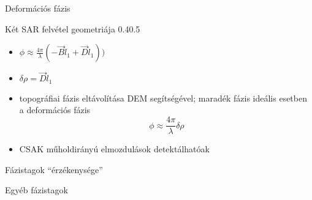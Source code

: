\def\ft{Deformációs fázis}

\begin{frame}{\ft}
    \begin{figp}{}{Két SAR felvétel geometriája \cite{BurgmannInSAR}}{0.4}{0.5}
        \begin{itemize}
            \item $\phi \approx \frac{4\pi}{\lambda} (- \vec{B}\hat{l}_1 + \vec{D}\hat{l}_1))$
            \item $\delta\rho = \vec{D}\hat{l}_1$
            \item topográfiai fázis eltávolítása DEM segítségével; maradék fázis ideális esetben a deformációs fázis $$\phi \approx \frac{4\pi}{\lambda}\delta\rho$$
            \item CSAK műholdirányú elmozdulások detektálhatóak
        \end{itemize}
    \end{figp}
\end{frame}


\begin{frame}{Fázistagok ``érzékenysége''}
    \begin{center}
    \begin{minipage}[b]{0.45\textwidth}
        \centering
        
    \end{minipage}
    \hspace{10pt}
    \begin{minipage}[b]{0.45\textwidth}
        \centering
        
    \end{minipage}
    \end{center}
\end{frame}


\def\ft{Egyéb fázistagok}

\begin{frame}{\ft}
    \begin{minic}{0.75}
    \end{minic}
\end{frame}

